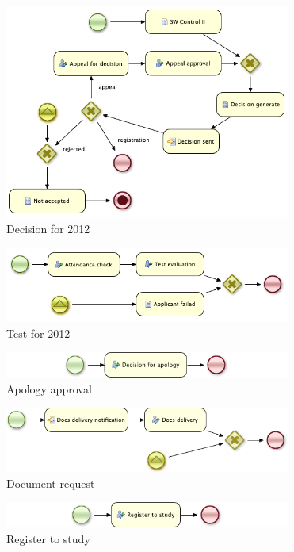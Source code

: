 	\begin{figure}[h]
		\label{fig:bpm:2012_decision}
		\centering
		\includegraphics[width=9.4cm]{figures/bpm/2012_decision}
		\caption{Decision for 2012}
	\end{figure}

	\begin{figure}[h]
		\label{fig:bpm:2012_test}
		\centering
		\includegraphics[width=9.4cm]{figures/bpm/2012_test}
		\caption{Test for 2012}
	\end{figure}

	\begin{figure}[h]
		\label{fig:bpm:apology_approval}
		\centering
		\includegraphics[width=9.4cm]{figures/bpm/apology_approval}
		\caption{Apology approval}
	\end{figure}

	\begin{figure}[h]
		\label{fig:bpm:document_request}
		\centering
		\includegraphics[width=9.4cm]{figures/bpm/document_request}
		\caption{Document request}
	\end{figure}

	\begin{figure}[h]
		\label{fig:bpm:register_to_study}
		\centering
		\includegraphics[width=9.4cm]{figures/bpm/register_to_study}
		\caption{Register to study}
	\end{figure}
	